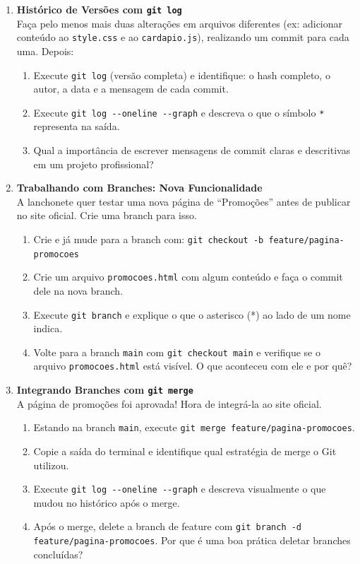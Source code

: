 \documentclass[12pt]{article}
\begin{document}
\begin{enumerate}[label=\textbf{Questão \arabic*:}, leftmargin=1.5cm, labelsep=0.5cm]
    \item \textbf{Histórico de Versões com \texttt{git log}} \\
    Faça pelo menos mais duas alterações em arquivos diferentes (ex: adicionar conteúdo ao \texttt{style.css} e ao \texttt{cardapio.js}), realizando um commit para cada uma. Depois:
    \begin{enumerate}[label=\alph*)]
        \item Execute \texttt{git log} (versão completa) e identifique: o hash completo, o autor, a data e a mensagem de cada commit.
        \item Execute \texttt{git log -{-}oneline -{-}graph} e descreva o que o símbolo \texttt{*} representa na saída.
        \item Qual a importância de escrever mensagens de commit claras e descritivas em um projeto profissional?
    \end{enumerate}

    \item \textbf{Trabalhando com Branches: Nova Funcionalidade} \\
    A lanchonete quer testar uma nova página de ``Promoções'' antes de publicar no site oficial. Crie uma branch para isso.
    \begin{enumerate}[label=\alph*)]
        \item Crie e já mude para a branch com: \texttt{git checkout -b feature/pagina-promocoes}
        \item Crie um arquivo \texttt{promocoes.html} com algum conteúdo e faça o commit dele na nova branch.
        \item Execute \texttt{git branch} e explique o que o asterisco (*) ao lado de um nome indica.
        \item Volte para a branch \texttt{main} com \texttt{git checkout main} e verifique se o arquivo \texttt{promocoes.html} está visível. O que aconteceu com ele e por quê?
    \end{enumerate}

    \item \textbf{Integrando Branches com \texttt{git merge}} \\
    A página de promoções foi aprovada! Hora de integrá-la ao site oficial.
    \begin{enumerate}[label=\alph*)]
        \item Estando na branch \texttt{main}, execute \texttt{git merge feature/pagina-promocoes}.
        \item Copie a saída do terminal e identifique qual estratégia de merge o Git utilizou.
        \item Execute \texttt{git log -{-}oneline -{-}graph} e descreva visualmente o que mudou no histórico após o merge.
        \item Após o merge, delete a branch de feature com \texttt{git branch -d feature/pagina-promocoes}. Por que é uma boa prática deletar branches concluídas?
    \end{enumerate}


\end{enumerate}
\end{document}
